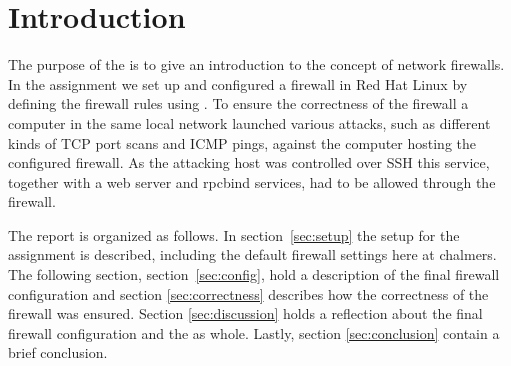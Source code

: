 \section{Introduction} 
\label{sec:intro}

The purpose of the \lab is to give an introduction to the concept of network firewalls. In the assignment we set up and configured a firewall in Red Hat Linux by defining the firewall rules using . To ensure the correctness of the firewall a computer in the same local network launched various attacks, such as different kinds of TCP port scans and ICMP pings, against the computer hosting the configured firewall. As the attacking host was controlled over SSH this service, together with a web server and rpcbind services, had to be allowed through the firewall. 

The report is organized as follows. In section~\ref{sec:setup} the setup for the assignment is described, including the default firewall settings here at chalmers. The following section, section~\ref{sec:config}, hold a description of the final firewall configuration and section \ref{sec:correctness} describes how the correctness of the firewall was ensured. Section \ref{sec:discussion} holds a reflection about the final firewall configuration and the \lab as whole. Lastly, section \ref{sec:conclusion} contain a brief conclusion.